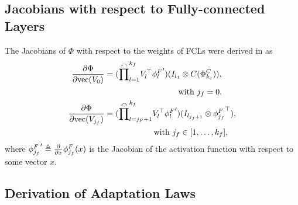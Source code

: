 \documentclass[letterpaper, 10 pt, conference]{ieeeconf}  %
\begin{document}

\subsection{Jacobians with respect to Fully-connected Layers}\label{subsec: Jacobian FCN}

The Jacobians of $\Phi$ with respect to the weights of FCLs were derived in \cite{DixonDNN} as
\begin{equation}
    \begin{aligned}
    \frac{\partial \Phi}{\partial \text{vec}( V_0)} &= 
        (\overset{\curvearrowleft}\prod^{k_f}_{l=1}  V^\top  _l{\phi^{F}_l}') ( I_{l_{1}} \otimes C(\Phi^C_{k_c})),\\
    &\hspace{90pt}\text{with }{j_f} =0, \hfilneg
    \\
    {\partial \Phi\over\partial \text{vec}(V_{j_f})} &=  
        (\overset{\curvearrowleft}\prod^{k_f}_{l={j_F}+1} V^\top  _l{\phi^{F}_l}') ( I_{l_{{j_f}+1}} \otimes {\phi_{j_f}^F}^\top  ), \\
    &\hspace{60pt}\text{with } {j_f} \in[1,\dots,k_f], \hfilneg
    \end{aligned}
\end{equation}
where ${\phi^F_{j_f}}'\triangleq {\partial \over \partial x} {\phi^F_{j_f}}(x)$ is the Jacobian of the activation function with respect to some vector $x$. 

\subsection{Derivation of Adaptation Laws} 
\end{document}
